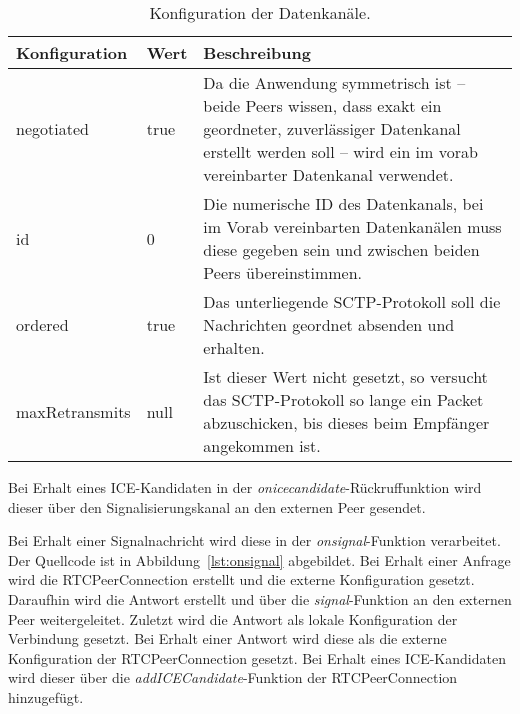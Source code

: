 \begin{table}[ht]
\centering
\begin{tabularx}{\textwidth}{llX}
\toprule
Konfiguration&Wert&Beschreibung\\

\midrule
negotiated&true&Da die Anwendung symmetrisch ist -- beide Peers wissen, dass exakt ein geordneter, zuverlässiger Datenkanal erstellt werden soll -- wird ein im vorab vereinbarter Datenkanal verwendet.\\
id&0&Die numerische ID des Datenkanals, bei im Vorab vereinbarten Datenkanälen muss diese gegeben sein und zwischen beiden Peers übereinstimmen.\\
ordered&true&Das unterliegende \acs{SCTP}-Protokoll soll die Nachrichten geordnet absenden und erhalten.\\
maxRetransmits&null&Ist dieser Wert nicht gesetzt, so versucht das  \acs{SCTP}-Protokoll so lange ein Packet abzuschicken, bis dieses beim Empfänger angekommen ist.\\
\bottomrule

\end{tabularx}
\caption{Konfiguration der Datenkanäle.}
\label{table:dataChannelConfig}
\end{table}

Bei Erhalt eines \acs{ICE}-Kandidaten in der \textit{onicecandidate}-Rückruffunktion wird dieser über den Signalisierungskanal an den externen Peer gesendet.\par

Bei Erhalt einer Signalnachricht wird diese in der \textit{onsignal}-Funktion verarbeitet. Der Quellcode ist in Abbildung~\ref{lst:onsignal} abgebildet. Bei Erhalt einer Anfrage wird die RTCPeerConnection erstellt und die externe Konfiguration gesetzt. Daraufhin wird die Antwort erstellt und über die \textit{signal}-Funktion an den externen Peer weitergeleitet. Zuletzt wird die Antwort als lokale Konfiguration der Verbindung gesetzt. Bei Erhalt einer Antwort wird diese als die externe Konfiguration der RTCPeerConnection gesetzt. Bei Erhalt eines \acs{ICE}-Kandidaten wird dieser über die \textit{addICECandidate}-Funktion der RTCPeerConnection hinzugefügt.

